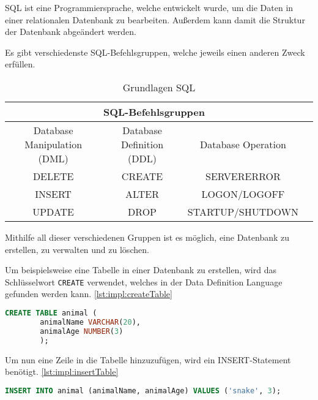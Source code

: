 
SQL ist eine Programmiersprache, welche entwickelt wurde, um die Daten in einer relationalen Datenbank zu bearbeiten. Außerdem kann damit die Struktur der Datenbank abgeändert werden. \cite{einfuerhungSQLBuch}
 
Es gibt verschiedenste SQL-Befehlsgruppen, welche jeweils einen anderen Zweck erfüllen. 
 
\begin{table}
    \centering
    \begin{tabular}{ |c|c|c|c| }
     \hline
     \multicolumn{3}{|c|}{SQL-Befehlsgruppen } \\
     \hline
     \hline
     Database Manipulation (DML) & Database Definition (DDL) & Database Operation  \\
     \hline
     \hline
     DELETE & CREATE & SERVERERROR \\
     \hline
     INSERT & ALTER & LOGON/LOGOFF \\
     \hline
     UPDATE & DROP & STARTUP/SHUTDOWN \\
     \hline
    \end{tabular}
    \caption{Grundlagen SQL \cite{grundlagenSQL}}
    
    \label{tab:allgemein:grundlagenSQL}
\end{table}
 
Mithilfe all dieser verschiedenen Gruppen ist es möglich, eine Datenbank zu erstellen, zu verwalten und zu löschen.
 
Um beispielsweise eine Tabelle in einer Datenbank zu erstellen, wird das Schlüsselwort \texttt{CREATE} verwendet, welches in der Data Definition Language gefunden werden kann. \ref{lst:impl:createTable}
 
\begin{lstlisting}[language=sql,caption=CREATE table,label=lst:impl:createTable]
    CREATE TABLE animal (
        animalName VARCHAR(20),
        animalAge NUMBER(3)
        );
\end{lstlisting}
 
Um nun eine Zeile in die Tabelle hinzuzufügen, wird ein INSERT-Statement benötigt. \ref{lst:impl:insertTable}
 
\begin{lstlisting}[language=sql,caption=INSERT INTO table,label=lst:impl:insertTable]
        INSERT INTO animal (animalName, animalAge) VALUES ('snake', 3);
\end{lstlisting}
 
